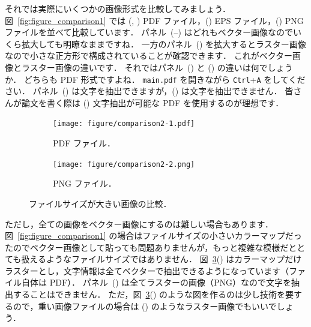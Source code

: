 それでは実際にいくつかの画像形式を比較してみましょう．
図~\ref{fig:figure_comparison1} では (, ) PDF ファイル，() EPS ファイル，() PNG ファイルを並べて比較しています．
パネル~(--) はどれもベクター画像なのでいくら拡大しても明瞭なままですね．
一方のパネル~() を拡大するとラスター画像なので小さな正方形で構成されていることが確認できます．
これがベクター画像とラスター画像の違いです．
それではパネル~() と () の違いは何でしょうか．
どちらも PDF 形式ですよね．
\verb|main.pdf| を開きながら \verb|Ctrl|+\verb|A| をしてください．
パネル~() は文字を抽出できますが，() は文字を抽出できません．
皆さんが論文を書く際は () 文字抽出が可能な PDF を使用するのが理想です．

\begin{figure}[tp]
    \centering
    \begin{subfigure}{0.45\columnwidth}
        \centering
        \texttt{[image: figure/comparison2-1.pdf]}
        \caption{PDF ファイル．}
        \label{subfig:figcomp2_pdf}
    \end{subfigure}
    \hspace{3mm} %
    \begin{subfigure}{0.45\columnwidth}
        \centering
        \texttt{[image: figure/comparison2-2.png]}
        \caption{PNG ファイル．}
        \label{subfig:figcomp2_png}
    \end{subfigure}
    \caption{ファイルサイズが大きい画像の比較．}
    \label{fig:figure_comparison2}
\end{figure}

ただし，全ての画像をベクター画像にするのは難しい場合もあります．
図~\ref{fig:figure_comparison1} の場合はファイルサイズの小さいカラーマップだったのでベクター画像として貼っても問題ありませんが，もっと複雑な模様だととても扱えるようなファイルサイズではありません．
図~\ref{fig:figure_comparison2}() はカラーマップだけラスターとし，文字情報は全てベクターで抽出できるようになっています（ファイル自体は PDF）．
パネル~() は全てラスターの画像（PNG）なので文字を抽出することはできません．
ただ，図~\ref{fig:figure_comparison2}() のような図を作るのは少し技術を要するので，重い画像ファイルの場合は () のようなラスター画像でもいいでしょう．

